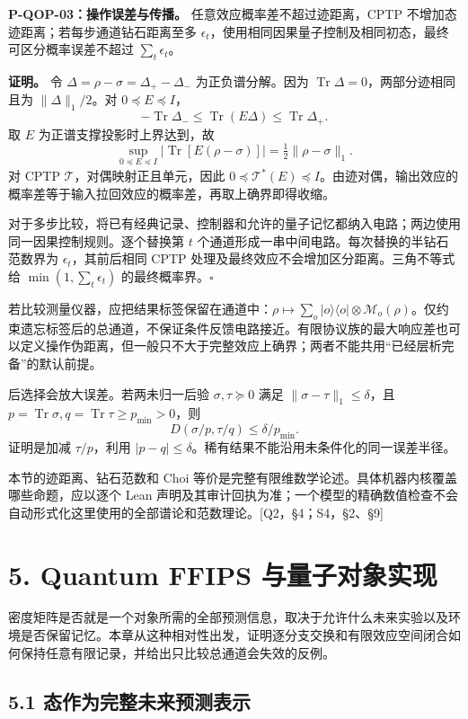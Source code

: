 \documentclass[
  11pt,
  oneside]{book}
\begin{document}
\textbf{P-QOP-03：操作误差与传播。} 任意效应概率差不超过迹距离，CPTP
不增加态迹距离；若每步通道钻石距离至多
\(\epsilon_t\)，使用相同因果量子控制及相同初态，最终可区分概率误差不超过
\(\sum_t\epsilon_t\)。

\textbf{证明。} 令 \(\Delta=\rho-\sigma=\Delta_+-\Delta_-\)
为正负谱分解。因为 \(\operatorname{Tr}\Delta=0\)，两部分迹相同且为
\(\|\Delta\|_1/2\)。对 \(0\preceq E\preceq I\)， \[
-\operatorname{Tr}\Delta_-\le\operatorname{Tr}(E\Delta)
\le\operatorname{Tr}\Delta_+.
\] 取 \(E\) 为正谱支撑投影时上界达到，故 \[
\sup_{0\preceq E\preceq I}|\operatorname{Tr}[E(\rho-\sigma)]|
=\tfrac12\|\rho-\sigma\|_1.
\] 对 CPTP \(\mathcal T\)，对偶映射正且单元，因此
\(0\preceq\mathcal T^*(E)\preceq I\)。由迹对偶，输出效应的概率差等于输入拉回效应的概率差，再取上确界即得收缩。

对于多步比较，将已有经典记录、控制器和允许的量子记忆都纳入电路；两边使用同一因果控制规则。逐个替换第
\(t\) 个通道形成一串中间电路。每次替换的半钻石范数界为
\(\epsilon_t\)，其前后相同 CPTP
处理及最终效应不会增加区分距离。三角不等式给
\(\min(1,\sum_t\epsilon_t)\) 的最终概率界。\(\square\)

若比较测量仪器，应把结果标签保留在通道中：\(\rho\mapsto\sum_o|o\rangle\langle o|\otimes\mathcal M_o(\rho)\)。仅约束遗忘标签后的总通道，不保证条件反馈电路接近。有限协议族的最大响应差也可以定义操作伪距离，但一般只不大于完整效应上确界；两者不能共用``已经层析完备''的默认前提。

后选择会放大误差。若两未归一后验 \(\sigma,\tau\succeq0\) 满足
\(\|\sigma-\tau\|_1\le\delta\)，且
\(p=\operatorname{Tr}\sigma,q=\operatorname{Tr}\tau\ge p_{\min}>0\)，则
\[
D(\sigma/p,\tau/q)\le\delta/p_{\min}.
\] 证明是加减 \(\tau/p\)，利用
\(|p-q|\le\delta\)。稀有结果不能沿用未条件化的同一误差半径。

本节的迹距离、钻石范数和 Choi
等价是完整有限维数学论述。具体机器内核覆盖哪些命题，应以逐个 Lean
声明及其审计回执为准；一个模型的精确数值检查不会自动形式化这里使用的全部谱论和范数理论。{[}Q2，§4；S4，§2、§9{]}

\chapter{5. Quantum FFIPS 与量子对象实现}\label{ch-5}\hypertarget{ch-5}{}

密度矩阵是否就是一个对象所需的全部预测信息，取决于允许什么未来实验以及环境是否保留记忆。本章从这种相对性出发，证明逐分支交换和有限效应空间闭合如何保持任意有限记录，并给出只比较总通道会失效的反例。

\section{5.1 态作为完整未来预测表示}
\end{document}
